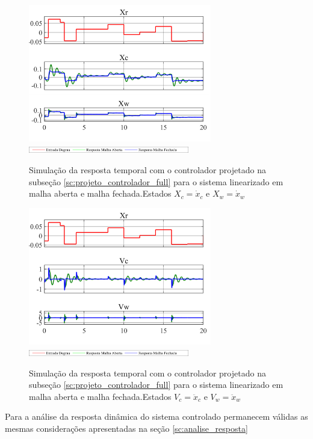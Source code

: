 \documentclass[a4paper]{ifacconf}
\begin{document}
\FloatBarrier
    \begin{figure}[htbp]
        \begin{centering}
            \includegraphics[width=8cm]{img/simulaca_temporal_linear_perturbacao.png}
            \includegraphics[width=7cm]{img/sim_linear_simulink_temp_leg.png}
            \caption{Simulação da resposta temporal com o controlador projetado na subseção \ref{sc:projeto_controlador_full} para o sistema linearizado em malha aberta e malha fechada.Estados $X_c = \dot{x}_c$ e $X_w = \dot{x}_w$ }
            \label{fig:simulaca_temporal_linear_perturbacao}
        \end{centering}
    \end{figure}
    \FloatBarrier
\FloatBarrier
    \begin{figure}[htbp]
        \begin{centering}
            \includegraphics[width=8cm]{img/simulaca_temporal_linear_perturbacao_V.png}
            \includegraphics[width=7cm]{img/sim_linear_simulink_temp_leg.png}
            \caption{Simulação da resposta temporal com o controlador projetado na subseção \ref{sc:projeto_controlador_full} para o sistema linearizado em malha aberta e malha fechada.Estados $V_c = \ddot{x}_c$ e $V_w = \ddot{x}_w$ }
            \label{fig:simulaca_temporal_linear_perturbacao}
        \end{centering}
    \end{figure}
    \FloatBarrier
Para a análise da resposta dinâmica do sistema controlado permanecem válidas as mesmas considerações apresentadas na seção \ref{sc:analise_resposta}
\end{document}
